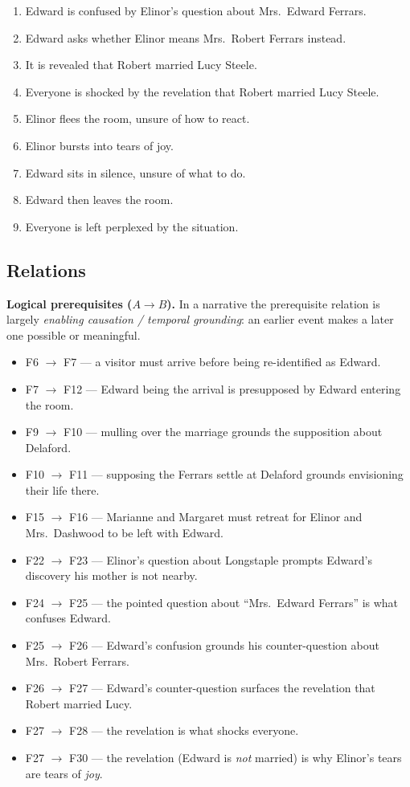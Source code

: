 \documentclass[11pt]{article}
\begin{document}
\begin{enumerate}[label=\textbf{F\arabic*.},leftmargin=*]
  \item Edward is confused by Elinor's question about Mrs.~Edward Ferrars.
  \item Edward asks whether Elinor means Mrs.~Robert Ferrars instead.
  \item It is revealed that Robert married Lucy Steele.
  \item Everyone is shocked by the revelation that Robert married Lucy Steele.
  \item Elinor flees the room, unsure of how to react.
  \item Elinor bursts into tears of joy.
  \item Edward sits in silence, unsure of what to do.
  \item Edward then leaves the room.
  \item Everyone is left perplexed by the situation.
\end{enumerate}

\subsection*{Relations}

\textbf{Logical prerequisites ($A \rightarrow B$).} In a narrative the
prerequisite relation is largely \emph{enabling causation / temporal grounding}:
an earlier event makes a later one possible or meaningful.

\begin{itemize}[leftmargin=*]
  \item F6 $\rightarrow$ F7 --- a visitor must arrive before being re-identified as Edward.
  \item F7 $\rightarrow$ F12 --- Edward being the arrival is presupposed by Edward entering the room.
  \item F9 $\rightarrow$ F10 --- mulling over the marriage grounds the supposition about Delaford.
  \item F10 $\rightarrow$ F11 --- supposing the Ferrars settle at Delaford grounds envisioning their life there.
  \item F15 $\rightarrow$ F16 --- Marianne and Margaret must retreat for Elinor and Mrs.~Dashwood to be left with Edward.
  \item F22 $\rightarrow$ F23 --- Elinor's question about Longstaple prompts Edward's discovery his mother is not nearby.
  \item F24 $\rightarrow$ F25 --- the pointed question about ``Mrs.~Edward Ferrars'' is what confuses Edward.
  \item F25 $\rightarrow$ F26 --- Edward's confusion grounds his counter-question about Mrs.~Robert Ferrars.
  \item F26 $\rightarrow$ F27 --- Edward's counter-question surfaces the revelation that Robert married Lucy.
  \item F27 $\rightarrow$ F28 --- the revelation is what shocks everyone.
  \item F27 $\rightarrow$ F30 --- the revelation (Edward is \emph{not} married) is why Elinor's tears are tears of \emph{joy}.
\end{itemize}
\end{document}
